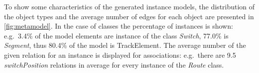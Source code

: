 To show some characteristics of the generated instance models, the distribution of the object types and the average number of edges for each object are presented in \autoref{fig:metamodel}. In the case of classes the percentage of instances is shown: e.g.\ 3.4\% of the model elements are instance of the class \emph{Switch}, 77.0\% is \emph{Segment}, thus 80.4\% of the model is TrackElement. The average number of the given relation for an instance is displayed for associations: e.g.\ there are 9.5 \emph{switchPosition} relations in average for every instance of the \emph{Route} class.